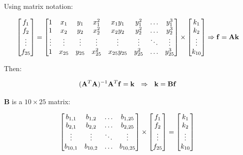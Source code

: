 \documentclass{ipol}
\numberwithin{equation}{section}
\numberwithin{table}{section}
\numberwithin{figure}{section}
\begin{document}
Using matrix notation:

\begin{equation*}
	\begin{bmatrix} 
		f_1		\\ 
		f_2		\\ 
		\vdots	\\
		f_{25}
	\end{bmatrix} 
	= 
	\begin{bmatrix} 
		1 		& x_1 		& y_1 		& x_1^2 	& x_1y_1 		& y_1^2 	& \hdots 	& y_1^3 	\\
		1 		& x_2 		& y_2 		& x_2^2 	& x_2y_2 		& y_2^2 	& \hdots 	& y_2^3 	\\
		\vdots	& \vdots	& \vdots	& \vdots	& \vdots		& \vdots	& \ddots	& \vdots	\\
		1 		& x_{25}	& y_{25}	& x_{25}^2 	& x_{25}y_{25} 	& y_{25}^2 	& \hdots 	& y_{25}^3
	\end{bmatrix}
	\times
	\begin{bmatrix}
		k_1		\\
		k_2		\\
		\vdots	\\
		k_{10}
	\end{bmatrix}
	\Rightarrow \mathbf{f} = \mathbf{A}\mathbf{k}\\
\end{equation*}

Then:

\begin{equation*}
	(\mathbf{A}^T\mathbf{A})^{-1}\mathbf{A}^T\mathbf{f} = \mathbf{k} \ \ \Rightarrow \ \ \mathbf{k} = \mathbf{B}\mathbf{f}\\
\end{equation*}

$\mathbf{B}$ is a $10\times25$ matrix: 

\begin{equation*}
	\begin{bmatrix}
		b_{1,1}		& b_{1,2}	& \hdots	& b_{1,25}	\\
		b_{2,1}		& b_{2,2}	& \hdots	& b_{2,25}	\\
		\vdots		& \vdots	& \ddots	& \vdots	\\
		b_{10,1}	& b_{10,2}	& \hdots	& b_{10,25}
	\end{bmatrix}
	\times
	\begin{bmatrix}
		f_1		\\
		f_2		\\
		\vdots	\\
		f_{25}
	\end{bmatrix}
	=
	\begin{bmatrix}
		k_1		\\
		k_2		\\
		\vdots	\\
		k_{10}
	\end{bmatrix}\\
\end{equation*}
\end{document}

